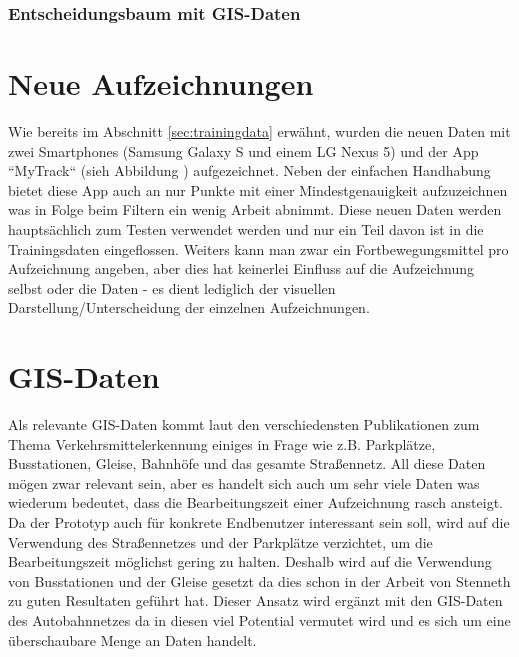 \clearpage

\subsubsection{Entscheidungsbaum mit GIS-Daten}
\label{entscheidungsbaumGIS}


\section{Neue Aufzeichnungen}
Wie bereits im Abschnitt \ref{sec:trainingdata} erwähnt, wurden die neuen Daten mit zwei Smartphones (Samsung Galaxy S und einem LG Nexus 5) und der App ``MyTrack`` (sieh Abbildung ) aufgezeichnet. Neben der einfachen Handhabung bietet diese App auch an nur Punkte mit einer Mindestgenauigkeit aufzuzeichnen was in Folge beim Filtern ein wenig Arbeit abnimmt. Diese neuen Daten werden hauptsächlich zum Testen verwendet werden und nur ein Teil davon ist in die Trainingsdaten eingeflossen. Weiters kann man zwar ein Fortbewegungsmittel pro Aufzeichnung angeben, aber dies hat keinerlei Einfluss auf die Aufzeichnung selbst oder die Daten - es dient lediglich der visuellen Darstellung/Unterscheidung der einzelnen Aufzeichnungen.


\section{GIS-Daten}
Als relevante GIS-Daten kommt laut den verschiedensten Publikationen zum Thema Verkehrsmittelerkennung einiges in Frage wie z.B. Parkplätze, Busstationen, Gleise, Bahnhöfe und das gesamte Straßennetz. All diese Daten mögen zwar relevant sein, aber es handelt sich auch um sehr viele Daten was wiederum bedeutet, dass die Bearbeitungszeit einer Aufzeichnung rasch ansteigt. Da der Prototyp auch für konkrete Endbenutzer interessant sein soll, wird auf die Verwendung des Straßennetzes und der Parkplätze verzichtet, um die Bearbeitungszeit möglichst gering zu halten. Deshalb wird auf die Verwendung von Busstationen und der Gleise gesetzt da dies schon in der Arbeit von Stenneth \cite{stenneth_transportation_2011} zu guten Resultaten geführt hat. Dieser Ansatz wird ergänzt mit den GIS-Daten des Autobahnnetzes da in diesen viel Potential vermutet wird und es sich um eine überschaubare Menge an Daten handelt.

